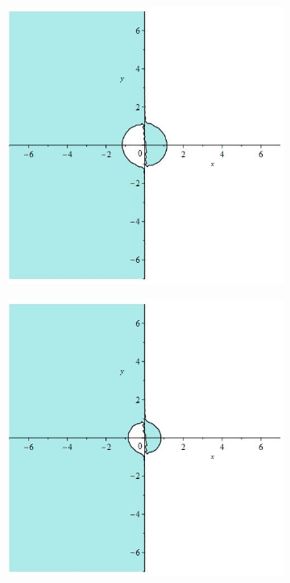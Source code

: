 \documentclass[12pt]{article}
\begin{document}
\begin{figure}[H]
\begin{subfigure}{0.24\textwidth}
    \end{subfigure}
     \begin{subfigure}{0.24\textwidth}
        \includegraphics[width=0.9\linewidth]{stabrks3_10.jpg}
    \end{subfigure}
    \begin{subfigure}{0.24\textwidth}
        \includegraphics[width=0.9\linewidth]{stabrks3_11.jpg}

\end{subfigure}
\end{figure}
\end{document}
